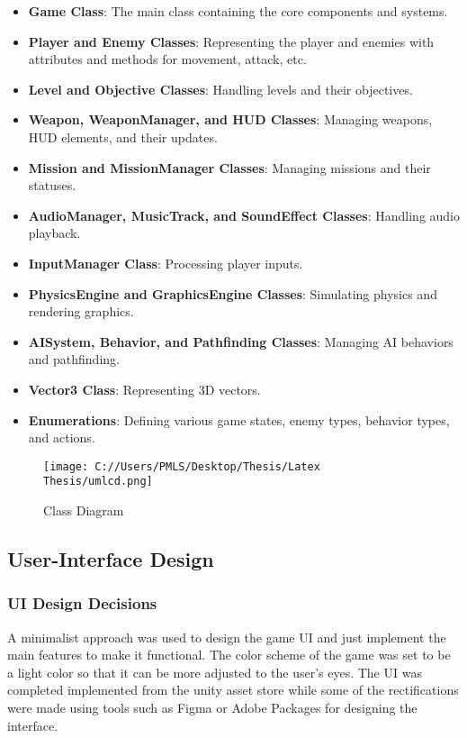 \begin{itemize}
	\item \textbf{Game Class}: The main class containing the core components and systems.
	\item \textbf{Player and Enemy Classes}: Representing the player and enemies with attributes and methods for movement, attack, etc.
	\item \textbf{Level and Objective Classes}: Handling levels and their objectives.
	\item \textbf{Weapon, WeaponManager, and HUD Classes}: Managing weapons, HUD elements, and their updates.
	\item \textbf{Mission and MissionManager Classes}: Managing missions and their statuses.
	\item \textbf{AudioManager, MusicTrack, and SoundEffect Classes}: Handling audio playback.
	\item \textbf{InputManager Class}: Processing player inputs.
	\item \textbf{PhysicsEngine and GraphicsEngine Classes}: Simulating physics and rendering graphics.
	\item \textbf{AISystem, Behavior, and Pathfinding Classes}: Managing AI behaviors and pathfinding.
	\item \textbf{Vector3 Class}: Representing 3D vectors.
	\item \textbf{Enumerations}: Defining various game states, enemy types, behavior types, and actions.
\end{itemize}

\begin{figure}[H]
	\centering
	\texttt{[image: C://Users/PMLS/Desktop/Thesis/Latex Thesis/umlcd.png]}
	\caption{Class Diagram}
	\label{fig:Class Diagram}
\end{figure}

\subsection{User-Interface Design}
\subsubsection{UI Design Decisions}
A minimalist approach was used to design the game UI and just implement the main features to make it functional. The color scheme of the game was set to be a light color so that it can be more adjusted to the user's eyes. The UI was completed implemented from the unity asset store while some of the rectifications were made using tools such as Figma or Adobe Packages for designing the interface.


